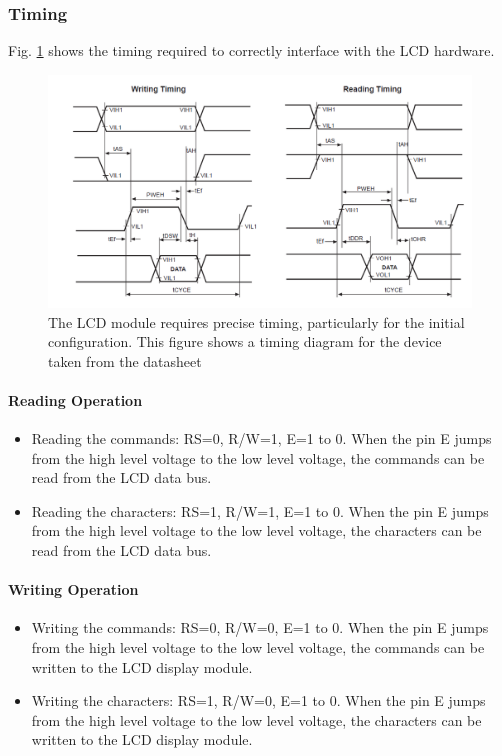 \documentclass[]{report}
\begin{document}
\subsubsection{Timing}
Fig. \ref{fig:LCDTiming} shows the timing required to correctly interface with the LCD hardware.
\begin{figure}
\centering
\includegraphics[width=0.7\linewidth]{"../Diagrams/LCD Timing"}
\caption{The LCD module requires precise timing, particularly for the initial configuration. This figure shows a timing diagram for the device taken from the datasheet}
\label{fig:LCDTiming}
\end{figure}

\paragraph{Reading Operation}
\begin{itemize}
	\item Reading the commands: RS=0, R/W=1, E=1 to 0. When the pin E jumps from the high level voltage to the low level voltage, the commands can be read from the LCD data bus.
	\item Reading the characters: RS=1, R/W=1, E=1 to 0. When the pin E jumps from the high level voltage to the low level voltage, the characters can be read from the LCD data bus.
\end{itemize}

\paragraph{Writing Operation}
\begin{itemize}
	\item Writing the commands: RS=0, R/W=0, E=1 to 0. When the pin E jumps from the high level voltage to the low level voltage, the commands can be written to the LCD display module.
	\item Writing the characters: RS=1, R/W=0, E=1 to 0. When the pin E jumps from the high level voltage to the low level voltage, the characters can be written to the LCD display module.
\end{itemize}
\end{document}

